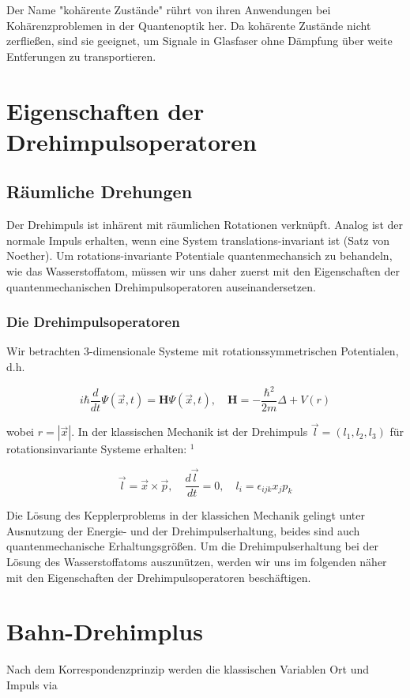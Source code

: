 \documentclass[10pt, letterpaper]{article}
\begin{document}
Der Name "kohärente Zustände" rührt von ihren Anwendungen bei Kohärenzproblemen in der Quantenoptik her. Da kohärente Zustände nicht zerfließen, sind sie geeignet, um Signale in Glasfaser ohne Dämpfung über weite Entferungen zu transportieren.



\pagebreak



\section{Eigenschaften der Drehimpulsoperatoren}

\subsection*{Räumliche Drehungen}
Der Drehimpuls ist inhärent mit räumlichen Rotationen verknüpft. Analog ist der normale Impuls erhalten, wenn eine System translations-invariant ist (Satz von Noether). Um rotations-invariante Potentiale quantenmechansich zu behandeln, wie das Wasserstoffatom, müssen wir uns daher zuerst mit den Eigenschaften der quantenmechanischen Drehimpulsoperatoren auseinandersetzen.

\subsubsection*{Die Drehimpulsoperatoren}
Wir betrachten 3-dimensionale Systeme mit rotationssymmetrischen Potentialen, d.h.

$$
i \hbar \frac{d}{d t} \Psi(\vec{x}, t)=\mathbf{H} \Psi(\vec{x}, t), \quad \mathbf{H}=-\frac{\hbar^{2}}{2 m} \Delta+V(r)
$$

wobei $r=|\vec{x}|$. In der klassischen Mechanik ist der Drehimpuls $\vec{l}=\left(l_{1}, l_{2}, l_{3}\right)$ für rotationsinvariante Systeme erhalten: ${ }^{1}$

$$
\vec{l}=\vec{x} \times \vec{p}, \quad \frac{d \vec{l}}{d t}=0, \quad l_{i}=\epsilon_{i j k} x_{j} p_{k}
$$

Die Lösung des Kepplerproblems in der klassichen Mechanik gelingt unter Ausnutzung der Energie- und der Drehimpulserhaltung, beides sind auch quantenmechanische Erhaltungsgrößen. Um die Drehimpulserhaltung bei der Lösung des Wasserstoffatoms auszunützen, werden wir uns im folgenden näher mit den Eigenschaften der Drehimpulsoperatoren beschäftigen.

\section*{Bahn-Drehimplus}
Nach dem Korrespondenzprinzip werden die klassischen Variablen Ort und Impuls via
\end{document}

